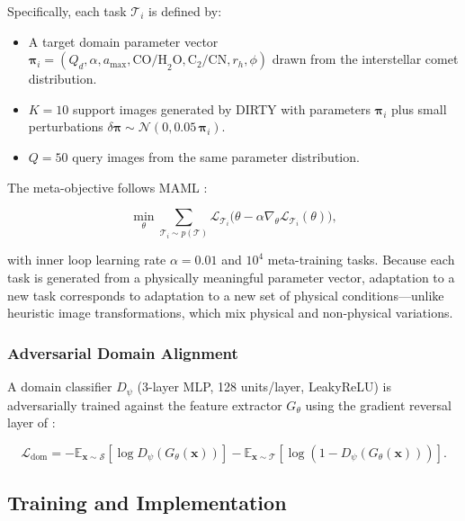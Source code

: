 \documentclass[preprint2]{aastex631}
\begin{document}
Specifically, each task $\mathcal{T}_i$ is defined by:
\begin{itemize}
    \item A target domain parameter vector $\boldsymbol{\pi}_i = (Q_d, \alpha, a_{\max}, \text{CO/H}_2\text{O}, \text{C}_2/\text{CN}, r_h, \phi)$ drawn from the interstellar comet distribution.
    \item $K=10$ support images generated by DIRTY with parameters $\boldsymbol{\pi}_i$ plus small perturbations $\delta\boldsymbol{\pi} \sim \mathcal{N}(0, 0.05\,\boldsymbol{\pi}_i)$.
    \item $Q=50$ query images from the same parameter distribution.
\end{itemize}

The meta-objective follows MAML \citep{finn17}:

\begin{equation}\label{eq:maml}
\min_\theta \sum_{\mathcal{T}_i \sim p(\mathcal{T})}
\mathcal{L}_{\mathcal{T}_i}\bigl(\theta - \alpha \nabla_\theta \mathcal{L}_{\mathcal{T}_i}(\theta)\bigr),
\end{equation}

with inner loop learning rate $\alpha = 0.01$ and $10^4$ meta-training tasks. Because each task is generated from a physically meaningful parameter vector, adaptation to a new task corresponds to adaptation to a new set of physical conditions---unlike heuristic image transformations, which mix physical and non-physical variations.

\subsubsection{Adversarial Domain Alignment}

A domain classifier $D_\psi$ (3-layer MLP, 128 units/layer, LeakyReLU) is adversarially trained against the feature extractor $G_\theta$ using the gradient reversal layer of \citet{ganin16}:

\begin{equation}\label{eq:adv_loss}
\mathcal{L}_{\text{dom}} = -\mathbb{E}_{\mathbf{x}\sim\mathcal{S}}[\log D_\psi(G_\theta(\mathbf{x}))] - \mathbb{E}_{\mathbf{x}\sim\mathcal{T}}[\log(1 - D_\psi(G_\theta(\mathbf{x})))].
\end{equation}

\subsection{Training and Implementation}
\end{document}
